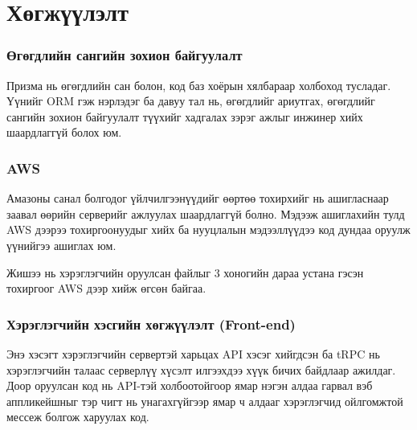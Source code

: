 \section{Хөгжүүлэлт}
\subsubsection{Өгөгдлийн сангийн зохион байгуулалт}
Призма нь өгөгдлийн сан болон, код баз хоёрын хялбараар холбоход тусладаг. Үүнийг ORM гэж нэрлэдэг ба давуу тал нь, өгөгдлийг ариутгах, өгөгдлийг сангийн зохион байгуулалт түүхийг хадгалах зэрэг ажлыг инжинер хийх шаардлаггүй болох юм.


\subsubsection{AWS}
 Амазоны санал болгодог үйлчилгээнүүдийг өөртөө тохирхийг нь ашигласнаар заавал өөрийн серверийг ажлуулах шаардлаггүй болно. Мэдээж ашиглахийн тулд AWS дээрээ тохиргоонуудыг хийх ба нууцлалын мэдээллүүдээ код дундаа оруулж үүнийгээ ашиглах юм.

 Жишээ нь хэрэглэгчийн оруулсан файлыг 3 хоногийн дараа устана гэсэн тохиргоог AWS дээр хийж өгсөн байгаа.





\subsubsection[Front-end]{Хэрэглэгчийн хэсгийн хөгжүүлэлт (Front-end)}
Энэ хэсэгт хэрэглэгчийн сервертэй харьцах API хэсэг хийгдсэн ба tRPC нь хэрэглэгчийн талаас серверлүү хүсэлт илгээхдээ хүүк бичих байдлаар ажилдаг. Доор оруулсан код нь  API-тэй холбоотойгоор ямар нэгэн алдаа гарвал вэб аппликейшныг тэр чигт нь унагахгүйгээр ямар ч алдааг хэрэглэгчид ойлгомжтой мессеж болгож харуулах код.


